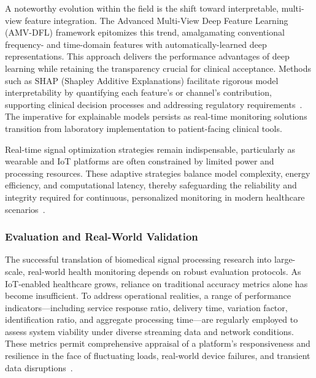 A noteworthy evolution within the field is the shift toward interpretable, multi-view feature integration. The Advanced Multi-View Deep Feature Learning (AMV-DFL) framework epitomizes this trend, amalgamating conventional frequency- and time-domain features with automatically-learned deep representations. This approach delivers the performance advantages of deep learning while retaining the transparency crucial for clinical acceptance. Methods such as SHAP (Shapley Additive Explanations) facilitate rigorous model interpretability by quantifying each feature's or channel's contribution, supporting clinical decision processes and addressing regulatory requirements~\cite{ref98,ref107}. The imperative for explainable models persists as real-time monitoring solutions transition from laboratory implementation to patient-facing clinical tools.

Real-time signal optimization strategies remain indispensable, particularly as wearable and IoT platforms are often constrained by limited power and processing resources. These adaptive strategies balance model complexity, energy efficiency, and computational latency, thereby safeguarding the reliability and integrity required for continuous, personalized monitoring in modern healthcare scenarios~\cite{ref107}.

\subsubsection{Evaluation and Real-World Validation}

The successful translation of biomedical signal processing research into large-scale, real-world health monitoring depends on robust evaluation protocols. As IoT-enabled healthcare grows, reliance on traditional accuracy metrics alone has become insufficient. To address operational realities, a range of performance indicators—including service response ratio, delivery time, variation factor, identification ratio, and aggregate processing time—are regularly employed to assess system viability under diverse streaming data and network conditions. These metrics permit comprehensive appraisal of a platform’s responsiveness and resilience in the face of fluctuating loads, real-world device failures, and transient data disruptions~\cite{ref106}.

